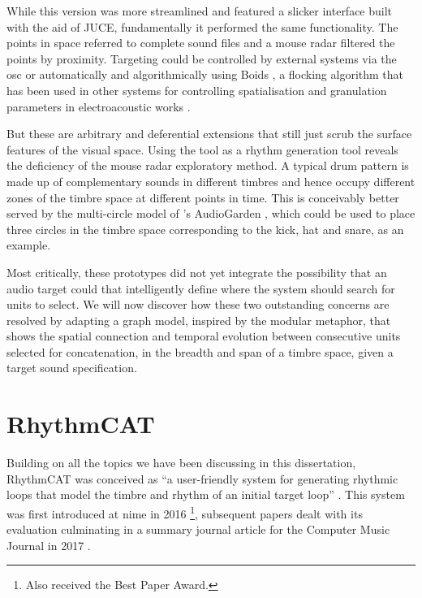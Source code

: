 While this version was more streamlined and featured a slicker interface built with the aid of JUCE, fundamentally it performed the same functionality. The points in space referred to complete sound files and a mouse radar filtered the points by proximity. Targeting could be controlled by external systems via the \acrshort{osc} or automatically and algorithmically using Boids \citep{Reynolds1987}, a flocking algorithm that has been used in other systems for controlling spatialisation and granulation parameters in electroacoustic works \citep{Kim-Boyle2006, Wilson2008, Barreiro2010}. 

But these are arbitrary and deferential extensions that still just scrub the surface features of  the visual space. Using the tool as a rhythm generation tool reveals the deficiency of the mouse radar exploratory method. A typical drum pattern is made up of complementary sounds in different timbres and hence occupy different zones of the timbre space at different points in time. This is conceivably better served by the multi-circle model of \citeauthor{Frisson2010}'s AudioGarden \citeyearpar{Frisson2010}, which could be used to place three circles in the timbre space corresponding to the kick, hat and snare, as an example.


Most critically, these prototypes did not yet integrate the possibility that an audio target could that intelligently define where the system should search for units to select. We will  now discover how these two outstanding concerns are resolved by adapting a graph model, inspired by the modular metaphor, that shows the spatial connection and temporal evolution between consecutive units selected for concatenation, in the breadth and span of a timbre space, given a target sound specification.

\section{RhythmCAT}

Building on all the topics we have been discussing in this dissertation, RhythmCAT was conceived as ``a user-friendly system for generating rhythmic loops that model the timbre and rhythm of an initial target loop'' \citep{Nuanain2017b}. This system was first introduced at \acrfull{nime} in 2016 \citep{Nuanain2016a}\footnote{Also received the Best Paper Award.}, subsequent papers dealt with its evaluation \citep{Nuanain2016b, Nuanain2016c} culminating in a summary journal article for the Computer Music Journal in 2017 \citep{Nuanain2017b}.

